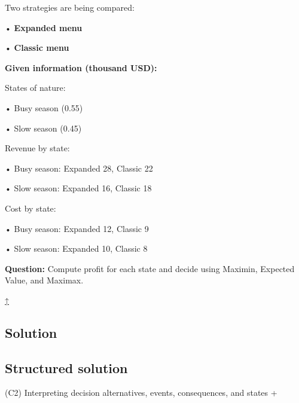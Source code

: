 \documentclass[11pt]{article}
\begin{document}
	
	Two strategies are being compared:
	
	
	
	• \textbf{Expanded menu}
	
	
	
	• \textbf{Classic menu}
	
	
	
	
	
	\textbf{Given information (thousand USD):}
	
	
	
	States of nature:
	
	
	
	• Busy season (0.55)
	
	
	
	• Slow season (0.45)
	
	
	
	
	
	Revenue by state:
	
	
	
	• Busy season: Expanded 28, Classic 22
	
	
	
	• Slow season: Expanded 16, Classic 18
	
	
	
	
	
	Cost by state:
	
	
	
	• Busy season: Expanded 12, Classic 9
	
	
	
	• Slow season: Expanded 10, Classic 8
	
	
	
	
	
	
	\textbf{Question:} Compute profit for each state and decide using Maximin, Expected Value, and Maximax.
	
	\hyperref[problem1-criteria]{↑}
	
	\subsection*{Solution}
	
	\label{problem1-solution}\label{problem1-criteria}
	
	\subsection*{Structured solution}
	
	
	
	
	
	(C2) Interpreting decision alternatives, events, consequences, and states
	+
	
\end{document}
